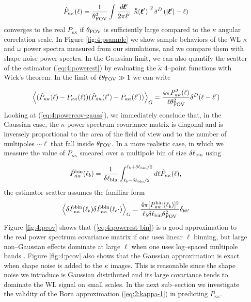 \begin{equation}
\label{eq:4:powerest}
\hat{P}_{\kappa\kappa}(\ell) = \frac{1}{\theta_{\rm FOV}^2}\int\frac{d\pmb{\ell}'}{2\pi\ell'}\left\vert\hat{\tilde{\kappa}}(\pmb{\ell}')\right\vert^2\delta^D\left(\vert\pmb{\ell}'\vert-\ell\right)
\end{equation}
%
converges to the real $P_{\kappa\kappa}$ if $\theta_{\rm FOV}$ is sufficiently large compared to the $\kappa$ angular correlation scale. In Figure \ref{fig:4:psample} we show sample behaviors of the WL $\kappa$ and $\omega$ power spectra measured from our simulations, and we compare them with shape noise power spectra. In the Gaussian limit, we can also quantify the scatter of the estimator (\ref{eq:4:powerest}) by evaluating the $\tilde{\kappa}$ 4--point functions with Wick's theorem. In the limit of $\ell\theta_{\rm FOV}\gg 1$ we can write 

\begin{equation}
\label{eq:4:powercov-gauss}
\left\langle(\hat{P}_{\kappa\kappa}(\ell)-P_{\kappa\kappa}(\ell))(\hat{P}_{\kappa\kappa}(\ell')-P_{\kappa\kappa}(\ell'))\right\rangle_G = \frac{4\pi P^2_{\kappa\kappa}(\ell)}{\ell\theta^2_{\rm FOV}}\delta^D(\ell-\ell')
\end{equation}
%
Looking at (\ref{eq:4:powercov-gauss}), we immediately conclude that, in the Gaussian case, the $\kappa$ power spectrum covariance matrix is diagonal and is inversely proportional to the area of the field of view and to the number of multipoles $\sim\ell$ that fall inside $\theta_{\rm FOV}$. In a more realistic case, in which we measure the value of $P_{\kappa\kappa}$ smeared over a multipole bin of size $\delta\ell_{\rm bin}$ using   

\begin{equation}
\label{eq:4:powerest-bin}
\hat{P}^{\rm bin}_{\kappa\kappa}(\ell_b) = \frac{1}{\delta\ell_{\rm bin}}\int_{\ell_b-\delta\ell_{\rm bin}/2}^{\ell_b+\delta\ell_{\rm bin}/2} d\ell \hat{P}_{\kappa\kappa}(\ell),
\end{equation}
%
the estimator scatter assumes the familiar form 
%
\begin{equation}
\label{eq:4:powercov-gauss-bin}
\left\langle\delta\hat{P}^{\rm bin}_{\kappa\kappa}(\ell_b)\delta\hat{P}^{\rm bin}_{\kappa\kappa}(\ell_{b'})\right\rangle_G = \frac{4\pi [P^{\rm bin}_{\kappa\kappa}(\ell_b)]^2}{\ell_b\delta\ell_{\rm bin}\theta^2_{\rm FOV}}\delta_{bb'}
\end{equation}
%
Figure \ref{fig:4:pcov} shows that (\ref{eq:4:powerest-bin}) is a good approximation to the real power spectrum covariance matrix if one uses linear $\ell$ binning, but large non--Gaussian effects dominate at large $\ell$ when one uses log--spaced multipole bands \citep{Sato12,PetriVariance}. Figure \ref{fig:4:pcov} also shows that the Gaussian approximation is exact when shape noise is added to the $\kappa$ images. This is reasonable since the shape noise we introduce is Gaussian distributed and its large covariance tends to dominate the WL signal on small scales. In the next sub--section we investigate the validity of the Born approximation (\ref{eq:2:kappa-1}) in predicting $P_{\kappa\kappa}$. 

